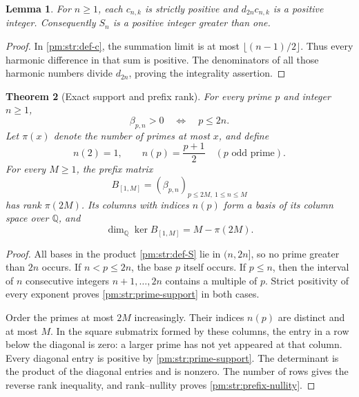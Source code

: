 \documentclass[11pt,a4paper]{article}
\newtheorem{theorem}{Theorem}[section]
\newtheorem{lemma}[theorem]{Lemma}
\theoremstyle{definition}
\theoremstyle{remark}
\numberwithin{equation}{section}
\begin{document}
\begin{lemma}\label{pm:str:positive-exponents}
For $n\geq1$, each $c_{n,k}$ is strictly positive and
$d_{2n}c_{n,k}$ is a positive integer.
Consequently $S_n$ is a positive integer greater than one.
\end{lemma}

\begin{proof}
In \eqref{pm:str:def-c}, the summation limit is at most
$\lfloor(n-1)/2\rfloor$.  Thus every harmonic difference in that
sum is positive.  The denominators of all those harmonic numbers divide
$d_{2n}$, proving the integrality assertion.
\end{proof}

\begin{theorem}[Exact support and prefix rank]\label{pm:str:prime-rank}
For every prime $p$ and integer $n\geq1$,
\begin{equation}\label{pm:str:prime-support}
 \beta_{p,n}>0\quad\Longleftrightarrow\quad p\leq2n.
\end{equation}
Let $\pi(x)$ denote the number of primes at most $x$, and define
\[
 n(2)=1,\qquad n(p)=\frac{p+1}{2}\quad(p\text{ odd prime}).
\]
For every $M\geq1$, the prefix matrix
\[
 B_{[1,M]}=(\beta_{p,n})_{p\leq2M,\ 1\leq n\leq M}
\]
has rank $\pi(2M)$.  Its columns with indices $n(p)$ form a basis of
its column space over $\mathbb Q$, and
\begin{equation}\label{pm:str:prefix-nullity}
 \dim_{\mathbb Q}\ker B_{[1,M]}=M-\pi(2M).
\end{equation}
\end{theorem}

\begin{proof}
All bases in the product \eqref{pm:str:def-S} lie in $(n,2n]$, so no
prime greater than $2n$ occurs.  If $n<p\leq2n$, the base $p$ itself
occurs.  If $p\leq n$, then the interval of $n$ consecutive integers
$n+1,\ldots,2n$ contains a multiple of $p$.  Strict positivity of every
exponent proves \eqref{pm:str:prime-support} in both cases.

Order the primes at most $2M$ increasingly.  Their indices $n(p)$
are distinct and at most $M$.  In the square submatrix formed by these
columns, the entry in a row below the diagonal is zero: a larger prime
has not yet appeared at that column.  Every diagonal entry is positive
by \eqref{pm:str:prime-support}.  The determinant is the product of the
diagonal entries and is nonzero.  The number of rows gives the reverse
rank inequality, and rank--nullity proves \eqref{pm:str:prefix-nullity}.
\end{proof}
\end{document}
